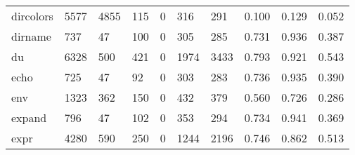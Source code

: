 \begin{longtable}{lp{1.3cm}p{1.3cm}p{1.3cm}p{1.3cm}p{1.3cm}p{1.3cm}p{1.3cm}p{1.3cm}p{1.3cm}}
dircolors &                   5577 &                               4855 &                               115 &                                0 &                               316 &                             291 &                                0.100 &                                  0.129 &                                0.052 \\
dirname   &                    737 &                                 47 &                               100 &                                0 &                               305 &                             285 &                                0.731 &                                  0.936 &                                0.387 \\
du        &                   6328 &                                500 &                               421 &                                0 &                              1974 &                            3433 &                                0.793 &                                  0.921 &                                0.543 \\
echo      &                    725 &                                 47 &                                92 &                                0 &                               303 &                             283 &                                0.736 &                                  0.935 &                                0.390 \\
env       &                   1323 &                                362 &                               150 &                                0 &                               432 &                             379 &                                0.560 &                                  0.726 &                                0.286 \\
expand    &                    796 &                                 47 &                               102 &                                0 &                               353 &                             294 &                                0.734 &                                  0.941 &                                0.369 \\
expr      &                   4280 &                                590 &                               250 &                                0 &                              1244 &                            2196 &                                0.746 &                                  0.862 &                                0.513 \\

\end{longtable}
